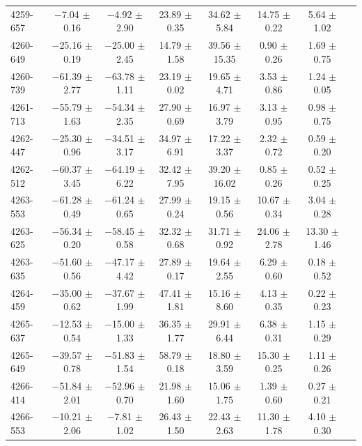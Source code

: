 \documentclass[a4paper,fleqn,usenatbib]{mnras}     %
\begin{document}
\begin{longtable}{l c c c c c c c }
4259-657   &    $-$7.04 $\pm$ 0.16   &    $-$4.92 $\pm$ 2.90   &    23.89 $\pm$ 0.35   &  34.62 $\pm$ 5.84   &  14.75 $\pm$ 0.22   &   5.64 $\pm$ 1.02  \\
4260-649   &   $-$25.16 $\pm$ 0.19   &   $-$25.00 $\pm$ 2.45   &    14.79 $\pm$ 1.58   &  39.56 $\pm$15.35   &   0.90 $\pm$ 0.26   &   1.69 $\pm$ 0.75  \\
4260-739   &   $-$61.39 $\pm$ 2.77   &   $-$63.78 $\pm$ 1.11   &    23.19 $\pm$ 0.02   &  19.65 $\pm$ 4.71   &   3.53 $\pm$ 0.86   &   1.24 $\pm$ 0.05  \\
4261-713   &   $-$55.79 $\pm$ 1.63   &   $-$54.34 $\pm$ 2.35   &    27.90 $\pm$ 0.69   &  16.97 $\pm$ 3.79   &   3.13 $\pm$ 0.95   &   0.98 $\pm$ 0.75  \\
4262-447   &   $-$25.30 $\pm$ 0.96   &   $-$34.51 $\pm$ 3.17   &    34.97 $\pm$ 6.91   &  17.22 $\pm$ 3.37   &   2.32 $\pm$ 0.72   &   0.59 $\pm$ 0.20  \\
4262-512   &   $-$60.37 $\pm$ 3.45   &   $-$64.19 $\pm$ 6.22   &    32.42 $\pm$ 7.95   &  39.20 $\pm$16.02   &   0.85 $\pm$ 0.26   &   0.52 $\pm$ 0.25  \\
4263-553   &   $-$61.28 $\pm$ 0.49   &   $-$61.24 $\pm$ 0.65   &    27.99 $\pm$ 0.24   &  19.15 $\pm$ 0.56   &  10.67 $\pm$ 0.34   &   3.04 $\pm$ 0.28  \\
4263-625   &   $-$56.34 $\pm$ 0.20   &   $-$58.45 $\pm$ 0.58   &    32.32 $\pm$ 0.68   &  31.71 $\pm$ 0.92   &  24.06 $\pm$ 2.78   &  13.30 $\pm$ 1.46  \\
4263-635   &   $-$51.60 $\pm$ 0.56   &   $-$47.17 $\pm$ 4.42   &    27.89 $\pm$ 0.17   &  19.64 $\pm$ 2.55   &   6.29 $\pm$ 0.60   &   0.18 $\pm$ 0.52  \\
4264-459   &   $-$35.00 $\pm$ 0.62   &   $-$37.67 $\pm$ 1.99   &    47.41 $\pm$ 1.81   &  15.16 $\pm$ 8.60   &   4.13 $\pm$ 0.35   &   0.22 $\pm$ 0.23  \\
4265-637   &   $-$12.53 $\pm$ 0.54   &   $-$15.00 $\pm$ 1.33   &    36.35 $\pm$ 1.77   &  29.91 $\pm$ 6.44   &   6.38 $\pm$ 0.31   &   1.15 $\pm$ 0.29  \\
4265-649   &   $-$39.57 $\pm$ 0.78   &   $-$51.83 $\pm$ 1.54   &    58.79 $\pm$ 0.18   &  18.80 $\pm$ 3.59   &  15.30 $\pm$ 0.25   &   1.11 $\pm$ 0.26  \\
4266-414   &   $-$51.84 $\pm$ 2.01   &   $-$52.96 $\pm$ 0.70   &    21.98 $\pm$ 1.60   &  15.06 $\pm$ 1.75   &   1.39 $\pm$ 0.60   &   0.27 $\pm$ 0.21  \\
4266-553   &   $-$10.21 $\pm$ 2.06   &    $-$7.81 $\pm$ 1.02   &    26.43 $\pm$ 1.50   &  22.43 $\pm$ 2.63   &  11.30 $\pm$ 1.78   &   4.10 $\pm$ 0.30  \\

\end{longtable}
\end{document}
